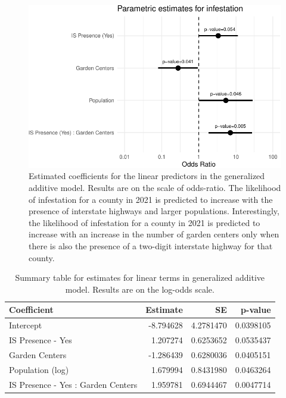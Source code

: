 \documentclass[
  letterpaper,
  DIV=11,
  numbers=noendperiod]{scrartcl}
\begin{document}
\begin{figure}

{\centering \includegraphics{revisions_statistical_analysis_files/figure-pdf/fig-estimates-1.pdf}

}

\caption{\label{fig-estimates}Estimated coefficients for the linear
predictors in the generalized additive model. Results are on the scale
of odds-ratio. The likelihood of infestation for a county in 2021 is
predicted to increase with the presence of interstate highways and
larger populations. Interestingly, the likelihood of infestation for a
county in 2021 is predicted to increase with an increase in the number
of garden centers only when there is also the presence of a two-digit
interstate highway for that county.}

\end{figure}

\hypertarget{tbl-mod-summ}{}
\begin{table}
\caption{\label{tbl-mod-summ}Summary table for estimates for linear terms in generalized additive
model. Results are on the log-odds scale. }\tabularnewline

\centering
\begin{tabular}{l|r|r|r}
\hline
Coefficient & Estimate & SE & p-value\\
\hline
Intercept & -8.794628 & 4.2781470 & 0.0398105\\
\hline
IS Presence - Yes & 1.207274 & 0.6253652 & 0.0535437\\
\hline
Garden Centers & -1.286439 & 0.6280036 & 0.0405151\\
\hline
Population (log) & 1.679994 & 0.8431980 & 0.0463264\\
\hline
IS Presence - Yes : Garden Centers & 1.959781 & 0.6944467 & 0.0047714\\
\hline
\end{tabular}
\end{table}
\end{document}
